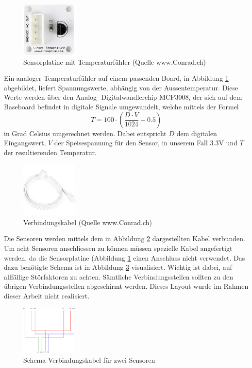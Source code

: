 \begin{figure}[H]%
\centering
\includegraphics[width=0.25\textwidth]{Images/Sensorplatine.jpg}
\caption{Sensorplatine mit Temperaturfühler (Quelle www.Conrad.ch)}
\label{fig:sensor}
\end{figure}

Ein analoger Temperaturfühler auf einem passenden Board, in Abbildung \ref{fig:sensor} abgebildet, liefert Spannungswerte, abhängig von der Aussentemperatur. Diese Werte werden über den Analog- Digitalwandlerchip MCP3008, der sich auf dem Baseboard befindet in digitale Signale umgewandelt, welche mittels der Formel
\[
	T = 100 \cdot \left( \frac{D \cdot V}{1024} - 0.5 \right) 
\]
in Grad Celsius umgerechnet werden. Dabei entspricht $D$ dem digitalen Eingangswert, $V$ der Speisespannung für den Sensor, in unserem Fall 3.3V und $T$ der resultierenden Temperatur.

\begin{figure}[H]%
\centering
\includegraphics[width=0.25\textwidth]{Images/Verbindungskabel.jpg}
\caption{Verbindungskabel (Quelle www.Conrad.ch)}
\label{fig:cable}
\end{figure}

Die Sensoren werden mittels dem in Abbildung \ref{fig:cable} dargestellten Kabel verbunden. Um acht Sensoren anschliessen zu können müssen spezielle Kabel angefertigt werden, da die Sensorplatine (Abbildung \ref{fig:sensor} einen Anschluss nicht verwendet. Das dazu benötigte Schema ist in Abbildung \ref{fig:schema_doppelsensor} visualisiert. Wichtig ist dabei, auf allfällige Störfaktoren zu achten. Sämtliche Verbindungsstellen sollten zu den übrigen Verbindungsstellen abgeschirmt werden. Dieses Layout wurde im Rahmen dieser Arbeit nicht realisiert.

\begin{figure}[H]%
\centering
\includegraphics[width=0.25\textwidth]{Images/Schema.png}
\caption{Schema Verbindungskabel für zwei Sensoren}
\label{fig:schema_doppelsensor}
\end{figure}

